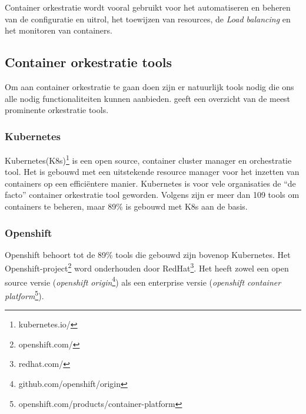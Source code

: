 Container orkestratie wordt vooral gebruikt voor het automatiseren en beheren van de configuratie en uitrol, het toewijzen van resources, de \textit{Load balancing} en het monitoren van containers.

\subsection{Container orkestratie tools}
Om aan container orkestratie te gaan doen zijn er natuurlijk tools nodig die ons alle nodig functionaliteiten kunnen aanbieden. \textcite{DevopsCube2021} geeft een overzicht van de meest prominente orkestratie tools.

\subsubsection{Kubernetes}
Kubernetes(K8s)\footnote{kubernetes.io/} is een open source, container cluster manager en orchestratie tool. Het is gebouwd met een uitstekende resource manager voor het inzetten van containers op een efficiëntere manier. Kubernetes is voor vele organisaties de ``de facto'' container orkestratie tool geworden. Volgens \textcite{CNCF2021} zijn er meer dan 109 tools om containers te beheren, maar 89\% is gebouwd met K8s aan de basis.

\subsubsection{Openshift}
Openshift behoort tot de 89\% tools die gebouwd zijn bovenop Kubernetes. Het Openshift-project\footnote{openshift.com/} word onderhouden door RedHat\footnote{redhat.com/}. Het heeft zowel een open source versie (\textit{openshift origin}\footnote{github.com/openshift/origin}) als een enterprise versie (\textit{openshift container platform}\footnote{openshift.com/products/container-platform}).

